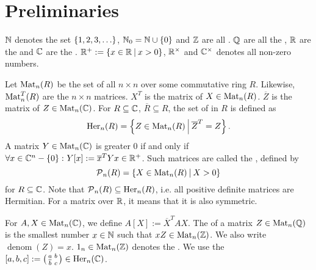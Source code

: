 

\section{Preliminaries}

$\mathbb{N}$ denotes the set $\Set{1,2,3,\dots}$, $\N_0 = \N \cup \Set{0}$ and $\mathbb{Z}$ are all . $\mathbb{Q}$ are all the , $\mathbb{R}$ are the  and $\mathbb{C}$ are the . $\R^+ := \Set{x\in\R}{x>0}$, $\mathbb{R}^\times$ and $\mathbb{C}^\times$ denotes all non-zero numbers.

Let $\operatorname{Mat}_n(R)$ be the set of all $n \times n$  over some commutative ring $R$.
Likewise, $\operatorname{Mat}_n^T(R)$ are the  $n \times n$ matrices.
$X^T$ is the  matrix of $X \in \operatorname{Mat}_n(R)$.
$\overline{Z}$ is the  matrix of $Z \in \operatorname{Mat}_n(\mathbb{C})$.
For $R \subseteq \mathbb{C}$, $\overline{R} \subseteq R$, the set of  in $R$ is defined as
\[ \Her_n(R) = \Set{Z \in \M_n(R)}{\overline{Z}^T = Z} . \]
A matrix $Y \in \operatorname{Mat}_n(\mathbb{C})$ is greater $0$ if and only if $\forall x \in \C^n - \Set{0} \colon Y[x] := \overline{x}^{T} Y x \in \R^+$.
Such matrices are called the , defined by
\[ \PM_n(R) = \Set{X \in \M_n(R)}{X > 0} \]
for $R \subseteq \mathbb{C}$. Note that $\operatorname{\mathcal{P}}_n(R) \subseteq \operatorname{Her}_n(R)$, i.e. all positive definite matrices are Hermitian. For a matrix over $\mathbb{R}$, it means that it is also symmetric.

For $A,X \in \operatorname{Mat}_n(\mathbb{C})$, we define $A[X] := \overline{X}^T A X$. 
The  of a matrix $Z \in \operatorname{Mat}_n(\mathbb{Q})$ is the smallest number $x \in \mathbb{N}$ such that $x Z \in \operatorname{Mat}_n(\mathbb{Z})$. We also write $\operatorname{denom}(Z) = x$. $1_n \in \operatorname{Mat}_n(\mathbb{Z})$ denotes the . We use the  $[a,b,c] := \left( \begin{smallmatrix} a & b \\ \overline b & c \end{smallmatrix} \right) \in \operatorname{Her}_n(\mathbb{C})$.

